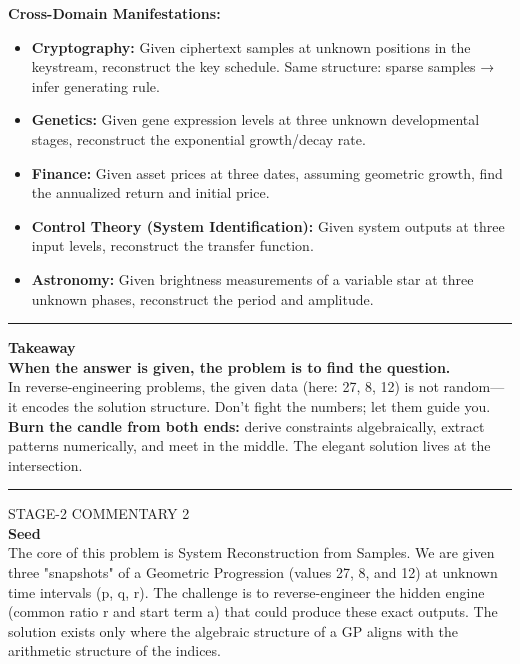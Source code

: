 \documentclass{article}
\begin{document}
\noindent \textbf{Cross-Domain Manifestations:}
\begin{itemize}
    \item \textbf{Cryptography:} Given ciphertext samples at unknown positions in the keystream, reconstruct the key schedule. Same structure: sparse samples → infer generating rule.
    \item \textbf{Genetics:} Given gene expression levels at three unknown developmental stages, reconstruct the exponential growth/decay rate.
    \item \textbf{Finance:} Given asset prices at three dates, assuming geometric growth, find the annualized return and initial price.
    \item \textbf{Control Theory (System Identification):} Given system outputs at three input levels, reconstruct the transfer function.
    \item \textbf{Astronomy:} Given brightness measurements of a variable star at three unknown phases, reconstruct the period and amplitude.
\end{itemize}

\noindent \rule{\textwidth}{0.4pt}

\noindent \textbf{Takeaway} \\

\noindent \textbf{When the answer is given, the problem is to find the question.} \\

\noindent In reverse-engineering problems, the given data (here: 27, 8, 12) is not random—it encodes the solution structure. Don't fight the numbers; let them guide you. \\

\noindent \textbf{Burn the candle from both ends:} derive constraints algebraically, extract patterns numerically, and meet in the middle. The elegant solution lives at the intersection. \\

\noindent \rule{\textwidth}{0.4pt}

\noindent STAGE-2 COMMENTARY 2 \\

\noindent \textbf{Seed} \\

\noindent The core of this problem is System Reconstruction from Samples. We are given three "snapshots" of a Geometric Progression (values 27, 8, and 12) at unknown time intervals (p, q, r). The challenge is to reverse-engineer the hidden engine (common ratio r and start term a) that could produce these exact outputs. The solution exists only where the algebraic structure of a GP aligns with the arithmetic structure of the indices. \\
\end{document}

